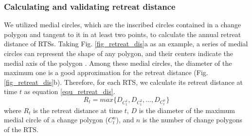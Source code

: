 \documentclass[authoryear,preprint,review,12pt]{elsarticle}
\begin{document}
\subsubsection{Calculating and validating retreat distance}
\label{sec_cal_retreat_dis}

We utilized medial circles, which are the inscribed circles contained in a change polygon and tangent to it in at least two points, to calculate the annual retreat distance of RTSs. 
Taking Fig. \ref{fig_retreat_dis}a as an example, a series of medial circles can represent the shape of any polygon, and their centers indicate the medial axis of the polygon \citep{zhu2014computing}. 
Among these medial circles, the diameter of the maximum one is a good approximation for the retreat distance (Fig. \ref{fig_retreat_dis}b).
Therefore, for each RTS, we calculate its retreat distance at time $t$ as equation \ref{equ_retreat_dis}.
\begin{equation}
R_t = max\{D_{C_t^1},D_{C_t^2},...,D_{C_t^n}\}
\label{equ_retreat_dis}
\end{equation}
where $R_t$ is the retreat distance at time $t$, $D$ is the diameter of the maximum medial circle of a change polygon ($C_t^n$), and $n$ is the number of change polygons of the RTS.
\end{document}
